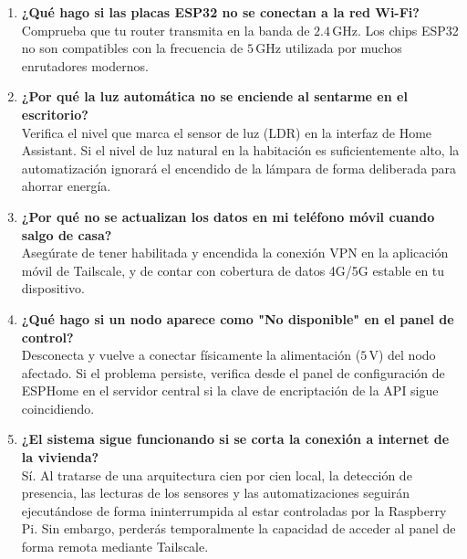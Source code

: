 \begin{enumerate}
    \item \textbf{¿Qué hago si las placas ESP32 no se conectan a la red Wi-Fi?} \\
    Comprueba que tu router transmita en la banda de $2.4\,\text{GHz}$. Los chips ESP32 no son compatibles con la frecuencia de $5\,\text{GHz}$ utilizada por muchos enrutadores modernos.

    \item \textbf{¿Por qué la luz automática no se enciende al sentarme en el escritorio?} \\
    Verifica el nivel que marca el sensor de luz (LDR) en la interfaz de Home Assistant. Si el nivel de luz natural en la habitación es suficientemente alto, la automatización ignorará el encendido de la lámpara de forma deliberada para ahorrar energía.

    \item \textbf{¿Por qué no se actualizan los datos en mi teléfono móvil cuando salgo de casa?} \\
    Asegúrate de tener habilitada y encendida la conexión VPN en la aplicación móvil de Tailscale, y de contar con cobertura de datos 4G/5G estable en tu dispositivo.
    
    \item \textbf{¿Qué hago si un nodo aparece como "No disponible" en el panel de control?} \\
    Desconecta y vuelve a conectar físicamente la alimentación ($5\,\text{V}$) del nodo afectado. Si el problema persiste, verifica desde el panel de configuración de ESPHome en el servidor central si la clave de encriptación de la API sigue coincidiendo.
    
    \item \textbf{¿El sistema sigue funcionando si se corta la conexión a internet de la vivienda?} \\
    Sí. Al tratarse de una arquitectura cien por cien local, la detección de presencia, las lecturas de los sensores y las automatizaciones seguirán ejecutándose de forma ininterrumpida al estar controladas por la Raspberry Pi. Sin embargo, perderás temporalmente la capacidad de acceder al panel de forma remota mediante Tailscale.
\end{enumerate}
